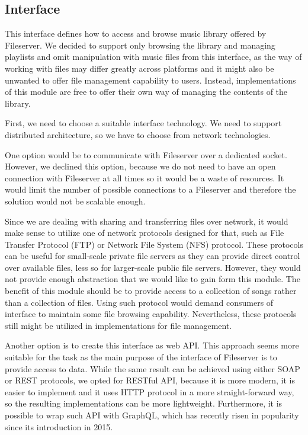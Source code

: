 \subsection{Interface}

This interface defines how to access and browse music library offered by Fileserver. We decided to support only browsing the library and managing playlists and omit manipulation with music files from this interface, as the way of working with files may differ greatly across platforms and it might also be unwanted to offer file management capability to users. Instead, implementations of this module are free to offer their own way of managing the contents of the library.
\par
First, we need to choose a suitable interface technology. We need to support distributed architecture, so we have to choose from network technologies.
\par
One option would be to communicate with Fileserver over a dedicated socket. However, we declined this option, because we do not need to have an open connection with Fileserver at all times so it would be a waste of resources. It would limit the number of possible connections to a Fileserver and therefore the solution would not be scalable enough.
\par
Since we are dealing with sharing and transferring files over network, it would make sense to utilize one of network protocols designed for that, such as File Transfer Protocol (FTP) or Network File System (NFS) protocol. These protocols can be useful for small-scale private file servers as they can provide direct control over available files, less so for larger-scale public file servers. However, they would not provide enough abstraction that we would like to gain form this module. The benefit of this module should be to provide access to a collection of songs rather than a collection of files. Using such protocol would demand consumers of interface to maintain some file browsing capability. Nevertheless, these protocols still might be utilized in implementations for file management.
\par
Another option is to create this interface as web API. This approach seems more suitable for the task as the main purpose of the interface of Fileserver is to provide access to data. While the same result can be achieved using either SOAP or REST protocols, we opted for RESTful API, because it is more modern, it is easier to implement and it uses HTTP protocol in a more straight-forward way, so the resulting implementations can be more lightweight. Furthermore, it is possible to wrap such API with GraphQL, which has recently risen in popularity since its introduction in 2015.
